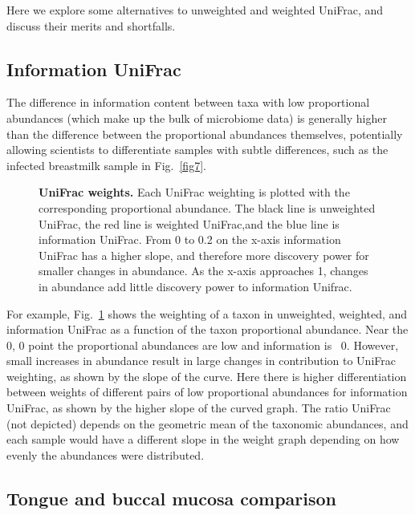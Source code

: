 \documentclass[10pt,letterpaper]{article}
\begin{document}
Here we explore some alternatives to unweighted and weighted UniFrac, and discuss their merits and shortfalls.

\FloatBarrier

\subsection{Information UniFrac}

The difference in information content between taxa with low proportional abundances (which make up the bulk of microbiome data) is generally higher than the difference between the proportional abundances themselves, potentially allowing scientists to differentiate samples with subtle differences, such as the infected breastmilk sample in Fig.~\ref{fig7}.

\begin{figure}[h]
\caption[UniFrac weights.]{{\bf UniFrac weights. }
Each UniFrac weighting is plotted with the corresponding proportional abundance. The black line is unweighted UniFrac, the red line is weighted UniFrac,and  the blue line is information UniFrac. From 0 to 0.2 on the x-axis information UniFrac has a higher slope, and therefore more discovery power for smaller changes in abundance. As the x-axis approaches 1, changes in abundance add little discovery power to information Unifrac.}
\label{fig5}
\end{figure}

For example, Fig.~\ref{fig5} shows the weighting of a taxon in unweighted, weighted, and information UniFrac as a function of the taxon proportional abundance. Near the 0, 0 point the proportional abundances are low and information is ~0. However, small increases in abundance result in large changes in contribution to UniFrac weighting, as shown by the slope of the curve. Here there is higher differentiation between weights of different pairs of low proportional abundances for information UniFrac, as shown by the higher slope of the curved graph. The ratio UniFrac (not depicted) depends on the geometric mean of the taxonomic abundances, and each sample would have a different slope in the weight graph depending on how evenly the abundances were distributed.

\FloatBarrier

\subsection{Tongue and buccal mucosa comparison}
\end{document}
